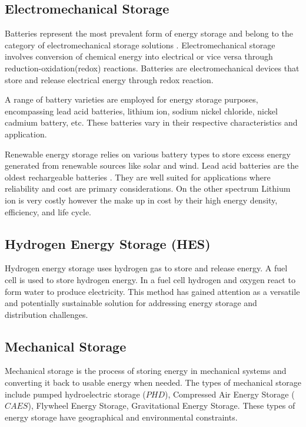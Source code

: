 \subsection{Electromechanical Storage} 
\sloppy
Batteries represent the most prevalent form of energy storage and belong to the category of electromechanical storage solutions \cite{Joseph2006}. Electromechanical storage involves conversion of chemical energy into electrical or vice versa through reduction-oxidation(redox) reactions. Batteries are electromechanical devices that store and release electrical energy through redox reaction.\par
A range of battery varieties are employed for energy storage purposes, encompassing lead acid batteries, lithium ion, sodium nickel chloride, nickel cadmium battery, etc. These batteries vary in their respective characteristics and application. \par
Renewable energy storage relies on various battery types to store excess energy generated from renewable sources like solar and wind. Lead acid batteries are the oldest rechargeable batteries \cite{Aneke2016}. They are well suited for applications where reliability and cost are primary considerations. On the other spectrum Lithium ion is very costly however the make up in cost by their high energy density, efficiency, and life cycle.

\subsection{Hydrogen Energy Storage (HES)} 
Hydrogen energy storage uses hydrogen gas to store and release energy. A fuel cell is used to store hydrogen energy. In a fuel cell hydrogen and oxygen react to form water to produce electricity. This method has gained attention as a versatile and potentially sustainable solution for addressing energy storage and distribution challenges. 

\subsection{Mechanical Storage} 
Mechanical storage is the process of storing energy in mechanical systems and converting it back to usable energy when needed. The types of mechanical storage include pumped hydroelectric storage ($PHD$), Compressed Air Energy Storage ($CAES$), Flywheel Energy Storage, Gravitational Energy Storage. These types of energy storage have geographical and environmental constraints.

